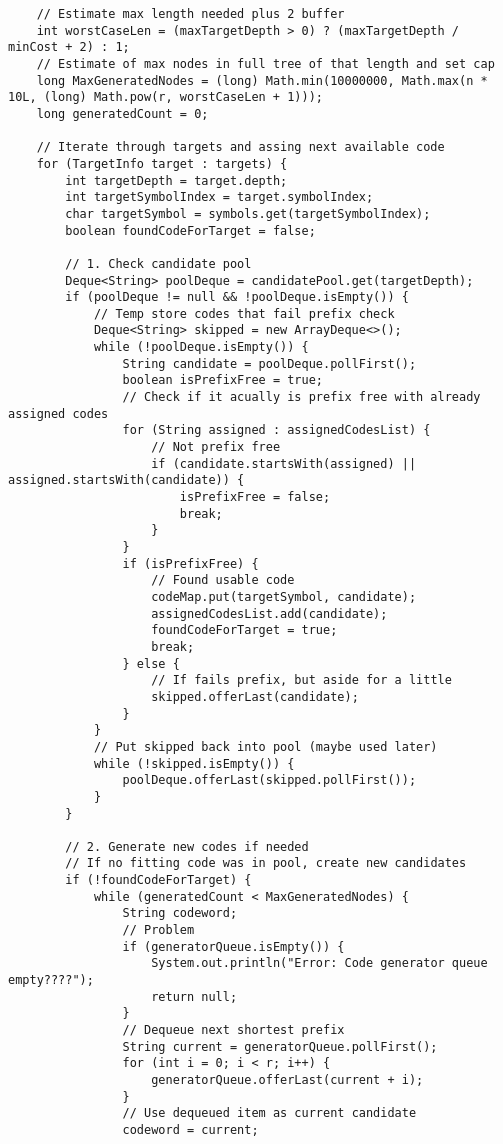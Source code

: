 \documentclass[a4paper,10pt,ngerman]{scrartcl}
\begin{document}
\begin{lstlisting}
    // Estimate max length needed plus 2 buffer
    int worstCaseLen = (maxTargetDepth > 0) ? (maxTargetDepth / minCost + 2) : 1;
    // Estimate of max nodes in full tree of that length and set cap
    long MaxGeneratedNodes = (long) Math.min(10000000, Math.max(n * 10L, (long) Math.pow(r, worstCaseLen + 1)));
    long generatedCount = 0;

    // Iterate through targets and assing next available code
    for (TargetInfo target : targets) {
        int targetDepth = target.depth;
        int targetSymbolIndex = target.symbolIndex;
        char targetSymbol = symbols.get(targetSymbolIndex);
        boolean foundCodeForTarget = false;

        // 1. Check candidate pool
        Deque<String> poolDeque = candidatePool.get(targetDepth);
        if (poolDeque != null && !poolDeque.isEmpty()) {
            // Temp store codes that fail prefix check
            Deque<String> skipped = new ArrayDeque<>();
            while (!poolDeque.isEmpty()) {
                String candidate = poolDeque.pollFirst();
                boolean isPrefixFree = true;
                // Check if it acually is prefix free with already assigned codes
                for (String assigned : assignedCodesList) {
                    // Not prefix free
                    if (candidate.startsWith(assigned) || assigned.startsWith(candidate)) {
                        isPrefixFree = false;
                        break;
                    }
                }
                if (isPrefixFree) {
                    // Found usable code
                    codeMap.put(targetSymbol, candidate);
                    assignedCodesList.add(candidate);
                    foundCodeForTarget = true;
                    break;
                } else {
                    // If fails prefix, but aside for a little
                    skipped.offerLast(candidate);
                }
            }
            // Put skipped back into pool (maybe used later)
            while (!skipped.isEmpty()) {
                poolDeque.offerLast(skipped.pollFirst());
            }
        }

        // 2. Generate new codes if needed
        // If no fitting code was in pool, create new candidates
        if (!foundCodeForTarget) {
            while (generatedCount < MaxGeneratedNodes) {
                String codeword;
                // Problem
                if (generatorQueue.isEmpty()) {
                    System.out.println("Error: Code generator queue empty????");
                    return null;
                }
                // Dequeue next shortest prefix
                String current = generatorQueue.pollFirst();
                for (int i = 0; i < r; i++) {
                    generatorQueue.offerLast(current + i);
                }
                // Use dequeued item as current candidate
                codeword = current;


\end{lstlisting}
\end{document}
